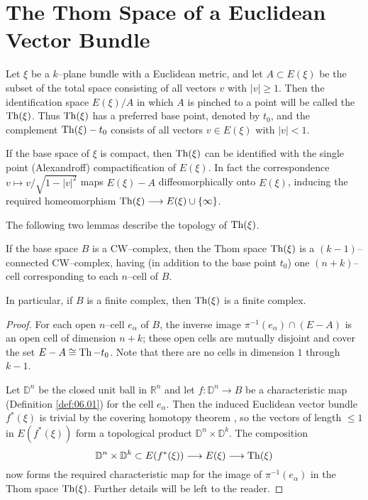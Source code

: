 \documentclass[../main]{subfiles}
\begin{document}
\section{The Thom Space of a Euclidean Vector Bundle}
Let $\xi$ be a $k$--plane bundle with a Euclidean metric, and let $A \subset E(\xi)$ be the subset of the total space consisting of all vectors $v$ with $|v| \ge 1$. Then the identification space $E(\xi)/A$ in which $A$ is pinched to a point will be called the  $\operatorname{Th}(\xi)$. Thus $\operatorname{Th}(\xi)$ has a preferred base point, denoted by $t_0$, and the complement $\operatorname{Th}(\xi) - t_0$ consists of all vectors $v \in E(\xi)$ with $|v| < 1$.

\begin{remark*}
If the base space of $\xi$ is compact, then $\operatorname{Th}(\xi)$ can be identified with the single point (Alexandroff) compactification of $E(\xi)$. In fact the correspondence $v \mapsto v/\sqrt{1 - |v|^2}$ maps $E(\xi) - A$ diffeomorphically onto $E(\xi)$, inducing the required homeomorphism $\operatorname{Th}(\xi) \longrightarrow E(\xi) \cup \{\infty\}$.
\end{remark*}

The following two lemmas describe the topology of $\operatorname{Th}(\xi)$. 

\begin{lemma}\label{lem:18.1}
If the base space $B$ is a CW--complex, then the Thom space $\operatorname{Th}(\xi)$ is a $(k - 1)$--connected CW--complex, having (in addition to the base point $t_0$) one $(n + k)$--cell corresponding to each $n$--cell of $B$. 
\end{lemma}

In particular, if $B$ is a finite complex, then $\operatorname{Th}(\xi)$ is a finite complex. 

\begin{proof}
For each open $n$--cell $e_\alpha$ of $B$, the inverse image $\pi^{-1}(e_\alpha) \cap (E - A)$ is an open cell of dimension $n + k$; these open cells are mutually disjoint and cover the set $E - A \cong \operatorname{Th} - t_0$. Note that there are no cells in dimension $1$ through $k - 1$. 

Let $\mathbb{D}^n$ be the closed unit ball in ${\mathbb R}^n$ and let $f : \mathbb{D}^n \longrightarrow B$ be a characteristic map (Definition \ref{def:06.01}) for the cell $e_\alpha$. Then the induced Euclidean vector bundle $f^\ast(\xi)$ is trivial by the covering homotopy theorem \cite[\S 11.6]{steenrod1951}, so the vectors of length $\le 1$ in $E(f^\ast(\xi))$ form a topological product $\mathbb{D}^n \times \mathbb{D}^k$. The composition \[\mathbb{D}^n \times \mathbb{D}^k \subset E(f^\ast(\xi)) \longrightarrow E(\xi) \longrightarrow \operatorname{Th}(\xi)\] now forms the required characteristic map for the image of $\pi^{-1}(e_\alpha)$ in the Thom space $\operatorname{Th}(\xi)$. Further details will be left to the reader.
\end{proof}
\end{document}
